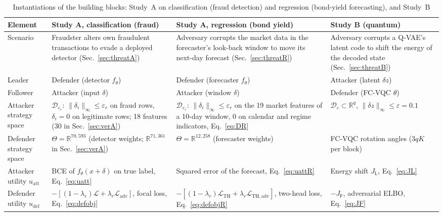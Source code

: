 \documentclass[conference]{IEEEtran}
\newcommand{\cL}{\mathcal{L}}
\begin{document}
\begin{table}[t]
\centering
\caption{Instantiations of the building blocks: Study~A on classification (fraud detection) and regression (bond-yield forecasting), and Study~B}
\label{tab:inst}
\footnotesize
\setlength{\tabcolsep}{3pt}
\begin{tabular}{@{}>{\raggedright\arraybackslash}p{2.0cm}>{\raggedright\arraybackslash}p{4.9cm}>{\raggedright\arraybackslash}p{4.9cm}>{\raggedright\arraybackslash}p{4.9cm}@{}}
\toprule
Element & Study A, classification (fraud) & Study A, regression (bond yield) & Study B (quantum) \\
\midrule
Scenario & Fraudster alters own fraudulent transactions to evade a deployed detector (Sec.~\ref{sec:threatA}) & Adversary corrupts the market data in the forecaster's look-back window to move its next-day forecast (Sec.~\ref{sec:threatR}) & Adversary corrupts a Q-VAE's latent code to shift the energy of the decoded state (Sec.~\ref{sec:threatB}) \\
Leader & Defender (detector $f_\theta$) & Defender (forecaster $f_\theta$) & Attacker (latent $\delta z$) \\
Follower & Attacker (input $\delta$) & Attacker (window $\delta$) & Defender (FC-VQC $\theta$) \\
Attacker strategy space & $\mathcal D_{\varepsilon_r}$: $\|\delta_i\|_\infty\le\varepsilon_r$ on fraud rows, $\delta_i=0$ on legitimate rows; 18 features (30 in Sec.~\ref{sec:verA}) & $\mathcal D_{\varepsilon_r}$: $\|\delta_i\|_\infty\le\varepsilon_r$ on the 19 market features of a 10-day window, 0 on calendar and regime indicators, Eq.~\eqref{eq:DR} & $\mathcal D_\varepsilon\subset\mathbb R^q$, $\|\delta z\|_\infty\le\varepsilon=0.1$ \\
Defender strategy space & $\Theta=\mathbb R^{70{,}593}$ (detector weights; $\mathbb R^{71{,}361}$ in Sec.~\ref{sec:verA}) & $\Theta=\mathbb R^{12{,}258}$ (forecaster weights) & FC-VQC rotation angles ($3qK$ per block) \\
Attacker utility $u_{\mathrm{att}}$ & BCE of $f_\theta(x{+}\delta)$ on true label, Eq.~\eqref{eq:uatt} & Squared error of the forecast, Eq.~\eqref{eq:uattR} & Energy shift $J_{\mathsf L}$, Eq.~\eqref{eq:JL} \\
Defender utility $u_{\mathrm{def}}$ & $-[(1{-}\lambda_r)\cL+\lambda_r\cL_{\mathrm{adv}}]$, focal loss, Eq.~\eqref{eq:defobj} & $-[(1{-}\lambda_r)\cL_{\mathrm{TH}}+\lambda_r\cL_{\mathrm{TH,adv}}]$, two-head loss, Eq.~\eqref{eq:defobjR} & $-J_{\mathsf F}$, adversarial ELBO, Eq.~\eqref{eq:JF} \\

\end{tabular}
\end{table}
\end{document}
